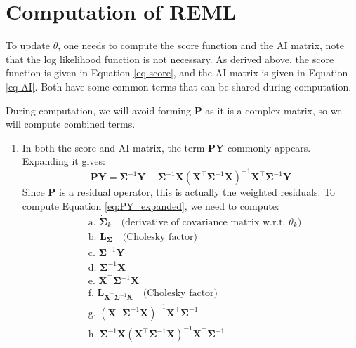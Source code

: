 \documentclass[
  letterpaper,
  DIV=11,
  numbers=noendperiod]{scrartcl}
\begin{document}
\section{Computation of REML}\label{computation-of-reml}

To update \(\theta\), one needs to compute the score function and the AI
matrix, note that the log likelihood function is not necessary. As
derived above, the score function is given in Equation \eqref{eq-score},
and the AI matrix is given in Equation \eqref{eq-AI}. Both have some
common terms that can be shared during computation.

During computation, we will avoid forming \(\symbf{P}\) as it is a
complex matrix, so we will compute combined terms.

\begin{enumerate}
\def\labelenumi{\arabic{enumi}.}
\item
  In both the score and AI matrix, the term \(\symbf{P}\symbf{Y}\)
  commonly appears. Expanding it gives: \begin{equation}
  \symbf{P}\symbf{Y} = \symbf{\Sigma}^{-1}\symbf{Y} - \symbf{\Sigma}^{-1}\symbf{X}(\symbf{X}^\top\symbf{\Sigma}^{-1}\symbf{X})^{-1}\symbf{X}^\top\symbf{\Sigma}^{-1}\symbf{Y}
  \label{eq:PY_expanded}
  \end{equation} Since \(\symbf{P}\) is a residual operator, this is
  actually the weighted residuals. To compute Equation
  \eqref{eq:PY_expanded}, we need to compute: \begin{align}
  &\text{a. } \dot{\symbf{\Sigma}}_k \quad \text{(derivative of covariance matrix w.r.t. $\theta_k$)} \nonumber \\
  &\text{b. } \symbf{L}_{\symbf{\Sigma}} \quad \text{(Cholesky factor)} \nonumber \\
  &\text{c. } \symbf{\Sigma}^{-1} \symbf{Y} \nonumber \\
  &\text{d. } \symbf{\Sigma}^{-1} \symbf{X} \nonumber \\
  &\text{e. } \symbf{X}^\top \symbf{\Sigma}^{-1} \symbf{X} \nonumber \\
  &\text{f. } \symbf{L}_{\symbf{X}^\top \symbf{\Sigma}^{-1} \symbf{X}} \quad \text{(Cholesky factor)} \nonumber \\
  &\text{g. } (\symbf{X}^\top \symbf{\Sigma}^{-1} \symbf{X})^{-1} \symbf{X}^\top \symbf{\Sigma}^{-1} \nonumber \\
  &\text{h. } \symbf{\Sigma}^{-1} \symbf{X} (\symbf{X}^\top \symbf{\Sigma}^{-1} \symbf{X})^{-1} \symbf{X}^\top \symbf{\Sigma}^{-1} \nonumber \\

\end{align}
\end{enumerate}
\end{document}
